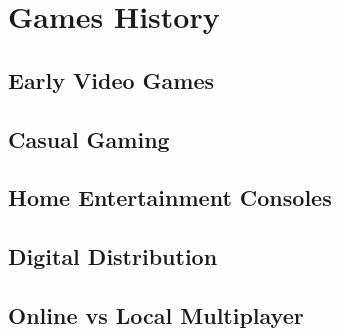 \chapter{Games History}
\section{Early Video Games}
\section{Casual Gaming}
\section{Home Entertainment Consoles}
\section{Digital Distribution}
\section{Online vs Local Multiplayer}

